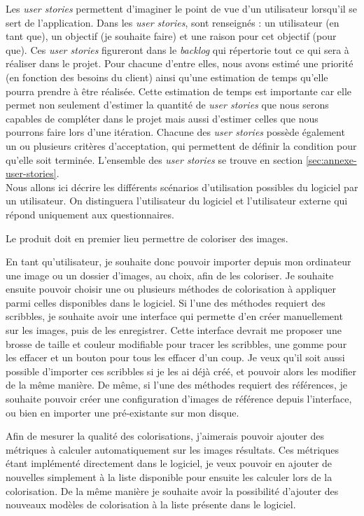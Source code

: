\documentclass{article}
\begin{document}
Les \textit{user stories} permettent d'imaginer le point de vue d'un utilisateur lorsqu'il se sert de l'application. Dans les \textit{user stories}, sont renseignés : un utilisateur 
(en tant que), un objectif (je souhaite faire) et une raison pour cet objectif (pour que).
Ces \textit{user stories} figureront dans le \textit{backlog} qui répertorie tout ce qui sera à réaliser dans le projet.
Pour chacune d'entre elles, nous avons estimé une priorité (en fonction des besoins du client) ainsi qu'une estimation de temps 
qu'elle pourra prendre à être réalisée. Cette estimation de temps est importante car elle permet non seulement d'estimer la quantité de 
\textit{user stories} que nous serons capables de compléter dans le projet mais aussi d'estimer celles que nous pourrons faire lors 
d'une itération. Chacune des \textit{user stories} possède également un ou plusieurs critères d'acceptation, qui permettent de 
définir la condition pour qu'elle soit terminée. L'ensemble des \textit{user stories} se trouve en section \ref{sec:annexe-user-stories}. \\ 

Nous allons ici décrire les différents scénarios d'utilisation possibles du logiciel par un utilisateur.
On distinguera l'utilisateur du logiciel et l'utilisateur externe qui répond uniquement aux questionnaires.

Le produit doit en premier lieu permettre de coloriser des images.

En tant qu'utilisateur, je souhaite donc pouvoir importer depuis mon ordinateur une image ou un dossier d'images, au choix, afin de les coloriser.
Je souhaite ensuite pouvoir choisir une ou plusieurs méthodes de colorisation à appliquer parmi celles disponibles dans le logiciel.
Si l'une des méthodes requiert des scribbles, je souhaite avoir une interface qui permette d'en créer manuellement sur les images, puis de les enregistrer. 
Cette interface devrait me proposer une brosse de taille et couleur modifiable pour tracer les scribbles, une gomme pour les effacer et un bouton pour tous les effacer d'un coup.
Je veux qu'il soit aussi possible d'importer ces scribbles si je les ai déjà créé, et pouvoir alors les modifier de la même manière.
De même, si l'une des méthodes requiert des références, je souhaite pouvoir créer une configuration d'images de référence depuis l'interface, ou bien en importer une pré-existante sur mon disque.

Afin de mesurer la qualité des colorisations, j'aimerais pouvoir ajouter des métriques à calculer automatiquement sur les images résultats.
Ces métriques étant implémenté directement dans le logiciel, je veux pouvoir en ajouter de nouvelles simplement à la liste disponible pour ensuite les calculer lors de la colorisation.
De la même manière je souhaite avoir la possibilité d'ajouter des nouveaux modèles de colorisation à la liste présente dans le logiciel.
\end{document}
